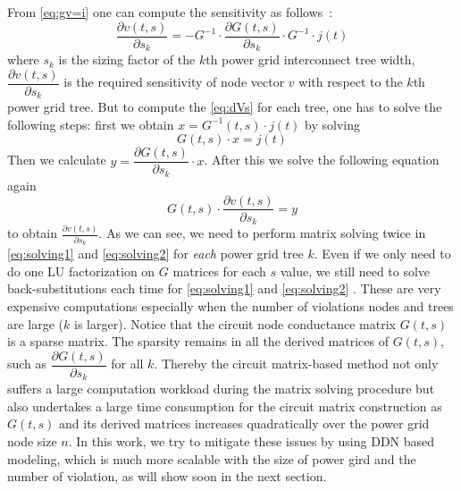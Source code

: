  From \eqref{eq:gv=i} one can compute the sensitivity as follows~\cite{Sukharev:2019pg}:
 \begin{equation}
	\label{eq:dVs}
	\dfrac{\partial v(t,s)}{\partial s_{k}} = -G^{-1}\cdot \dfrac{\partial G(t,s)}{\partial s_{k}}  \cdot G^{-1}\cdot j(t)
      \end{equation}
 where $s_{k}$ is the sizing factor of the $k$th power grid interconnect tree width, $\dfrac{\partial v(t,s)}{\partial s_{k}}$ is the required sensitivity of node vector $v$ with respect to the $k$th power grid tree. But to compute the \eqref{eq:dVs} for each tree, one has to solve the following steps: first we obtain $x = G^{-1}(t,s) \cdot j(t)$ by solving 
 \begin{equation}
   G(t,s) \cdot x = j(t)
   \label{eq:solving1}
\end{equation}
Then we calculate $y = \dfrac{\partial G(t,s)}{\partial s_{k}} \cdot x$. After this we solve the following equation again
\begin{equation}
  G(t,s) \cdot \dfrac{\partial v(t,s)}{\partial s_{k}} = y
\label{eq:solving2}
\end{equation}
to obtain $ \frac{\partial v(t,s)}{\partial s_{k}} $.  As we can see, we need to perform matrix solving twice in \eqref{eq:solving1} and \eqref{eq:solving2} for {\it each} power grid tree $k$. Even if we only need to do one LU factorization on $G$ matrices for each $s$ value, we still need to solve back-substitutions each time for \eqref{eq:solving1} and \eqref{eq:solving2} . These are very expensive computations especially when the number of violations nodes and trees are large ($k$ is larger).
Notice that the circuit node conductance matrix $G(t,s)$ is a sparse matrix. The sparsity remains in all the derived matrices of $G(t,s)$, such as $\dfrac{\partial G(t,s)}{\partial s_{k}}$ for all $k$.
Thereby the circuit matrix-based method not only suffers a large computation workload during the matrix solving procedure but also undertakes a large time consumption for the circuit matrix construction as $G(t,s)$ and its derived matrices increases quadratically over the power grid node size $n$. In this work, we try to mitigate these issues by using DDN based modeling, which is much more scalable with the size of power gird and the number of violation, as will show soon in the next section. 


